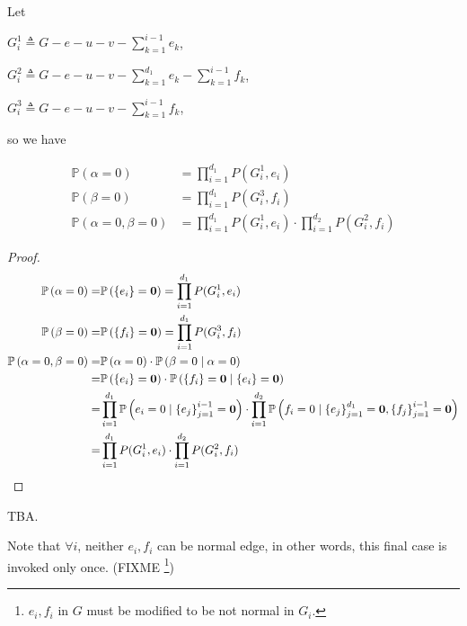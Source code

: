 Let

$G_i^1 \triangleq G - e - u - v - \sum_{k=1}^{i-1} e_k$,

$G_i^2 \triangleq G-e-u-v - \sum_{k=1}^{d_1}e_k - \sum_{k=1}^{i-1} f_k$,

$G_i^3 \triangleq G - e - u - v - \sum_{k=1}^{i-1} f_k$,

so we have

\begin{Prop}
	\begin{align*}
		\mathbb{P}\left( \alpha = 0\right) &= \prod_{i=1}^{d_1} P(G_i^1, e_i) \\
		\mathbb{P}\left( \beta = 0\right) &= \prod_{i=1}^{d_1} P(G_i^3, f_i) \\
		\mathbb{P}\left( \alpha = 0, \beta = 0 \right) &= \prod_{i=1}^{d_1} P(G_i^1, e_i) \cdot \prod_{i=1}^{d_2} P(G_i^2, f_i)
	\end{align*}
\end{Prop}

\begin{proof}
	\begin{align*}
		\mathbb{P}\left( \alpha = 0\right) =&\mathbb{P} \left( \left\{e_i\right\} = \mathbf{0}\right) =	\prod_{i=1}^{d_1} P(G_i^1, e_i) \\
		\mathbb{P}\left( \beta = 0\right) =&\mathbb{P} \left( \left\{f_i\right\} = \mathbf{0}\right) =	\prod_{i=1}^{d_1} P(G_i^3, f_i) \\
		\mathbb{P}\left( \alpha = 0, \beta = 0 \right) =& \mathbb{P} \left( \alpha = 0 \right) \cdot \mathbb{P}\left( \beta = 0 \mid \alpha = 0 \right) \\
		=& \mathbb{P} \left( \left\{e_i\right\} = \mathbf{0}\right) \cdot \mathbb{P} \left( \left\{f_i\right\} = \mathbf{0} \mid \left\{e_i\right\} = \mathbf{0} \right) \\
=&\prod_{i=1}^{d_1} \mathbb{P} \left( e_i = 0 \mid \left\{e_j\right\}_{j=1}^{i-1} = \mathbf{0} \right) \cdot \prod_{i=1}^{d_2} \mathbb{P} \left( f_i = 0 \mid \left\{e_j\right\}_{j=1}^{d_1} = \mathbf{0},\left\{f_j\right\}_{j=1}^{i-1} = \mathbf{0} \right) \\
=& \prod_{i=1}^{d_1} P(G_i^1, e_i) \cdot \prod_{i=1}^{d_2} P(G_i^2, f_i)
	\end{align*}
\end{proof}

\begin{Cor}
	TBA.
\end{Cor}

Note that $\forall i$, neither $e_i, f_i$ can be normal edge, in other words, this final case is invoked only once.
(FIXME \footnote{$e_i,f_i$ in $G$ must be modified to be not normal in $G_i$.})

